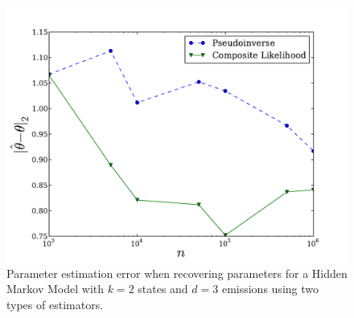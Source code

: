%


\begin{figure}
  \centering
  \includegraphics[width=0.8\columnwidth]{figures/hmm-2-3.pdf}
  \caption{Parameter estimation error when recovering parameters for a Hidden
  Markov Model with $k=2$ states and $d=3$ emissions using two types of estimators.}
    \label{fig:cl-hmm}
\end{figure}
